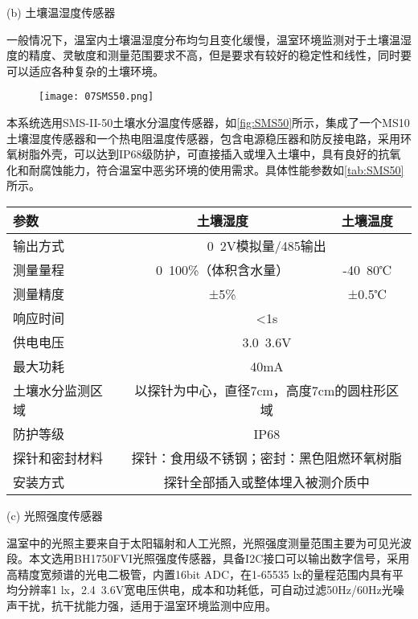 		(b) 土壤温湿度传感器
		
		一般情况下，温室内土壤温湿度分布均匀且变化缓慢，温室环境监测对于土壤温湿度的精度、灵敏度和测量范围要求不高，但是要求有较好的稳定性和线性，同时要可以适应各种复杂的土壤环境。
  		\begin{figure}[!htp]
  			\centering
 			\texttt{[image: 07SMS50.png]}
		\end{figure}
		本系统选用SMS-II-50土壤水分温度传感器，如\ref{fig:SMS50}所示，集成了一个MS10土壤湿度传感器和一个热电阻温度传感器，包含电源稳压器和防反接电路，采用环氧树脂外壳，可以达到IP68级防护，可直接插入或埋入土壤中，具有良好的抗氧化和耐腐蚀能力，符合温室中恶劣环境的使用需求。具体性能参数如\ref{tab:SMS50}所示。
		
		\begin{table}[!hpb]
  			\centering
  			\begin{tabular}{lcc} \toprule
    		参数 & 土壤湿度 & 土壤温度 \\ \midrule
    		输出方式 & \multicolumn{2}{c}{0~2V模拟量/485输出} \\
    		测量量程 & 0~100\%（体积含水量） & -40~80℃\\
			测量精度 & ±5\% & ±0.5℃\\
    		响应时间 & \multicolumn{2}{c}{<1s} \\
    		供电电压 & \multicolumn{2}{c}{3.0~3.6V} \\
    		最大功耗 & \multicolumn{2}{c}{40mA} \\
    		土壤水分监测区域 & \multicolumn{2}{c}{以探针为中心，直径7cm，高度7cm的圆柱形区域} \\
    		防护等级 & \multicolumn{2}{c}{IP68} \\
    		探针和密封材料 & \multicolumn{2}{c}{探针：食用级不锈钢；密封：黑色阻燃环氧树脂} \\
    		安装方式 & \multicolumn{2}{c}{探针全部插入或整体埋入被测介质中} \\ \bottomrule
 			\end{tabular}
		\end{table}

		(c) 光照强度传感器
		
温室中的光照主要来自于太阳辐射和人工光照，光照强度测量范围主要为可见光波段。本文选用BH1750FVI光照强度传感器，具备I2C接口可以输出数字信号，采用高精度宽频谱的光电二极管，内置16bit ADC，在1-65535 lx的量程范围内具有平均分辨率1 lx，2.4~3.6V宽电压供电，成本和功耗低，可自动过滤50Hz/60Hz光噪声干扰，抗干扰能力强，适用于温室环境监测中应用。

